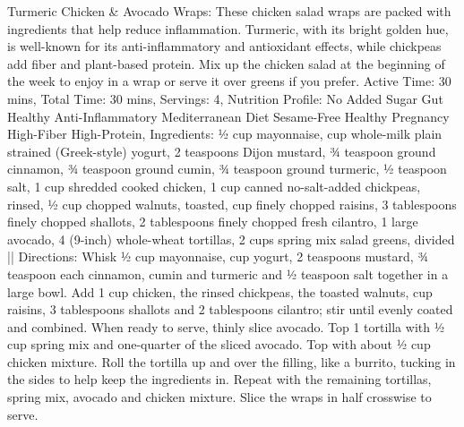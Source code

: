Turmeric Chicken \& Avocado Wraps: These chicken salad wraps are packed with ingredients that help reduce inflammation. Turmeric, with its bright golden hue, is well-known for its anti-inflammatory and antioxidant effects, while chickpeas add fiber and plant-based protein. Mix up the chicken salad at the beginning of the week to enjoy in a wrap or serve it over greens if you prefer. Active Time: 30 mins, Total Time: 30 mins, Servings: 4, Nutrition Profile: No Added Sugar Gut Healthy Anti-Inflammatory Mediterranean Diet Sesame-Free Healthy Pregnancy High-Fiber High-Protein, Ingredients: ½ cup mayonnaise,  cup whole-milk plain strained (Greek-style) yogurt, 2 teaspoons Dijon mustard, ¾ teaspoon ground cinnamon, ¾ teaspoon ground cumin, ¾ teaspoon ground turmeric, ½ teaspoon salt, 1 cup shredded cooked chicken, 1 cup canned no-salt-added chickpeas, rinsed, ½ cup chopped walnuts, toasted,  cup finely chopped raisins, 3 tablespoons finely chopped shallots, 2 tablespoons finely chopped fresh cilantro, 1 large avocado, 4 (9-inch) whole-wheat tortillas, 2 cups spring mix salad greens, divided || Directions: Whisk ½ cup mayonnaise,  cup yogurt, 2 teaspoons mustard, ¾ teaspoon each cinnamon, cumin and turmeric and ½ teaspoon salt together in a large bowl. Add 1 cup chicken, the rinsed chickpeas, the toasted walnuts,  cup raisins, 3 tablespoons shallots and 2 tablespoons cilantro; stir until evenly coated and combined. When ready to serve, thinly slice avocado. Top 1 tortilla with ½ cup spring mix and one-quarter of the sliced avocado. Top with about ½ cup chicken mixture. Roll the tortilla up and over the filling, like a burrito, tucking in the sides to help keep the ingredients in. Repeat with the remaining tortillas, spring mix, avocado and chicken mixture. Slice the wraps in half crosswise to serve.
\par

